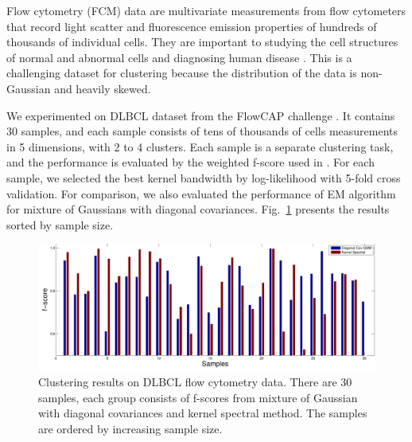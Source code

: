 
Flow cytometry (FCM) data are multivariate measurements from flow cytometers that record light scatter and fluorescence emission properties of hundreds of thousands of individual cells. They are important to studying the cell structures of normal and abnormal cells and diagnosing human disease \cite{cytometry_nature}. This is a challenging dataset for clustering because the distribution of the data is non-Gaussian and heavily skewed.

We experimented on DLBCL dataset from the FlowCAP challenge \cite{cytometry_nature}. It contains 30 samples, and each sample consists of tens of thousands of cells measurements in 5 dimensions, with 2 to 4 clusters. Each sample is a separate clustering task, and the performance is evaluated by the weighted f-score used in \cite{cytometry_nature}. For each sample, we selected the best kernel bandwidth by log-likelihood with 5-fold cross validation. For comparison, we also evaluated the performance of EM algorithm for mixture of Gaussians with diagonal covariances. Fig.~\ref{fig:real_data} presents the results sorted by sample size.


\begin{figure}[h]
  \centering
  \includegraphics[width=0.9\columnwidth]{../experiment/figure/paired_bar_chat} 
   \vspace{-3mm}
  \caption{Clustering results on DLBCL flow cytometry data. There are 30 samples, each group consists of f-scores from mixture of Gaussian with diagonal covariances and kernel spectral method. The samples are ordered by increasing sample size.}\label{fig:real_data}
  \vspace{-3mm}
\end{figure}
